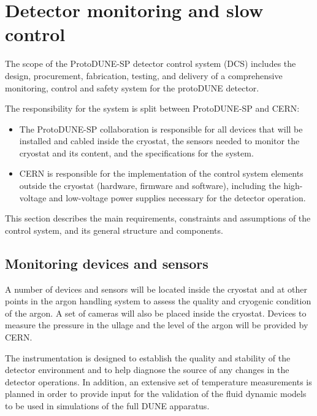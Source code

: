 \section{Detector monitoring and slow control}
\label{sec:detmonitoring}

The scope of the ProtoDUNE-SP detector control system (DCS) includes the design, procurement, fabrication, testing,
and delivery
of a comprehensive monitoring, control and safety system for the protoDUNE detector.

The responsibility for the system is split between ProtoDUNE-SP and CERN: 
\begin{itemize}
\item	The ProtoDUNE-SP collaboration is responsible for all devices that will be installed and cabled inside 
the cryostat, the sensors needed to monitor the cryostat and its content, and the specifications for the system. %
\item	CERN is responsible for the implementation of the control system elements outside the cryostat (hardware, firmware and software), including the high-voltage and low-voltage power supplies necessary for the detector operation.
\end{itemize}

This section describes %
the main requirements, 
constraints and assumptions of the control system, and its general structure and components. 

\subsection{Monitoring devices and sensors}
\label{sec:mon-dev-sensors}

A number of %
devices and sensors will be located inside the cryostat 
and at other points in the argon handling system
to assess
the quality and cryogenic condition of the argon.
A set of cameras will also be placed inside the cryostat. Devices to measure the pressure in the ullage and the level of the argon will be provided by CERN.

The instrumentation is designed to establish the quality and stability of the detector environment and to help diagnose the source of any changes in the detector operations. In addition, an extensive set of temperature measurements is planned in order to provide input for the validation of the fluid dynamic models to be used in simulations of the full DUNE apparatus.


